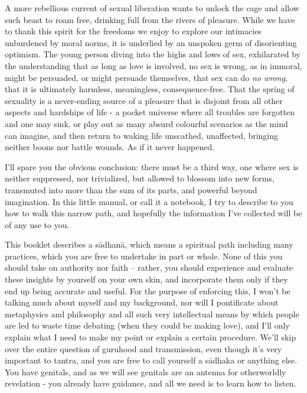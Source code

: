 \documentclass[a4paper,14pt]{memoir}
\newcommand{\sadhaka}{sādhaka}
\newcommand{\sadhana}{sādhanā}
\begin{document}
A more rebellious current of sexual liberation wants to unlock the cage and allow such beast to roam free, drinking full from the rivers of pleasure. While we have to thank this spirit for the freedoms we enjoy to explore our intimacies unburdened by moral norms, it is underlied by an unspoken germ of disorienting optimism. The young person diving into the highs and lows of sex, exhilarated by the understanding that as long as love is involved, no sex is wrong, as in immoral, might be persuaded, or might persuade themselves, that sex can do \emph{no wrong}, that it is ultimately harmless, meaningless, consequence-free. That the spring of sexuality is a never-ending source of a pleasure that is disjoint from all other aspects and hardships of life - a pocket universe where all troubles are forgotten and one may sink, or play out as many absurd colourful scenarios as the mind can imagine, and then return to waking life unscathed, unaffected, bringing neither boons nor battle wounds. As if it never happened.

I'll spare you the obvious conclusion: there must be a third way, one where sex is neither suppressed, nor trivialized, but allowed to blossom into new forms, transmuted into more than the sum of its parts, and powerful beyond imagination. In this little manual, or call it a notebook, I try to describe to you how to walk this narrow path, and hopefully the information I've collected will be of any use to you.

This booklet describes a \sadhana{}, which means a spiritual path including many practices, which you are free to undertake in part or whole. None of this you should take on authority nor faith -- rather, you should experience and evaluate these insights by yourself on your own skin, and incorporate them only if they end up being accurate and useful. For the purpose of enforcing this, I won't be talking much about myself and my background, nor will I pontificate about metaphysics and philosophy and all such very intellectual means by which people are led to waste time debating (when they could be making love), and I'll only explain what I need to make my point or explain a certain procedure. We'll skip over the entire question of guruhood and transmission, even though it's very important to tantra, and you are free to call yourself a \sadhaka{} or anything else. You have genitals, and as we will see genitals are an antenna for otherworldly revelation - you already have guidance, and all we need is to learn how to listen.
\end{document}
